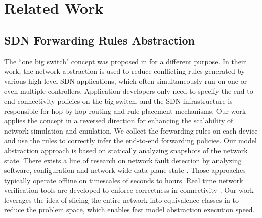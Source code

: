 \section{Related Work}

\subsection{SDN Forwarding Rules Abstraction}

The ``one big switch" concept was proposed in \cite{OneBigSwitchAbstraction} for a different purpose. In their work, the network abstraction is used to reduce conflicting rules generated by various high-level SDN applications, which often simultaneously run on one or even multiple controllers. Application developers only need to specify the end-to-end connectivity policies on the big switch, and the SDN infrastructure is responsible for hop-by-hop routing and rule placement mechanisms.
Our work applies the concept in a reversed direction for enhancing the scalability of network simulation and emulation. We collect the forwarding rules on each device and use the rules to correctly infer the end-to-end forwarding policies.
Our model abstraction approach is based on statically analyzing snapshots of the network state. There exists a line of research on network fault detection by analyzing software, configuration and network-wide data-plane state \cite{Al-Shaer2010,Al-Shaer2009,Anteater2011,xz+05}. Those approaches typically operate offline on timescales of seconds to hours. Real time network verification tools are developed to enforce correctness in connectivity \cite{NetPlumber2013,Veriflow}. Our work leverages the idea of slicing the entire network into equivalence classes in \cite{Veriflow} to reduce the problem space, which enables fast model abstraction execution speed.



